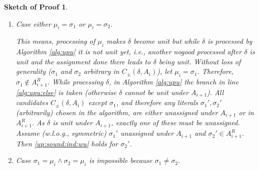 \documentclass{vutinfth} %
\newtheorem{proof-sketch}{Sketch of Proof}[chapter]
\newcommand{\ass}{A}
\newcommand{\cdpm}{C_\pm}
\newcommand{\sgl}{\mu}
\newcommand{\bsgl}{\sigma}
\begin{document}
\begin{proof-sketch}
\begin{enumerate}
\begin{enumerate}[label=\alph*),ref=\theenumi.\alph*]
\begin{enumerate}[label=\roman*.,ref=\theenumii.\roman*]
		$\Delta_i^\pm(\bsgl_1) = \Delta_{i+1}^\pm(\bsgl_1)$ and $\Delta_i^\pm(\bsgl_2) = \Delta_{i+1}^\pm(\bsgl_2)$, as watch sets are only modified in case $\bsgl_1 = \sgl_i$ and respectively $\bsgl_2 = \sgl_i$ (see Algorithm \ref{alg:upu}: only nogoods that are being iterated over in line \ref{alg:upu:it} are being removed from any watch sets in line \ref{alg:upu:rm}). Both $\bsgl_1$ and $\bsgl_2$ are in $A_{i+1}^R$, because $\ass_{i}^R \setminus \{ \sgl_i \} \subseteq \ass_{i+1}^R$, thus we have \ref{up:sound:ind:wu}.
		
		\item Case either $\sgl_i = \bsgl_1$ or $\sgl_i = \bsgl_2$.
		\label{sigmaprimes}		
		
		This means, processing of $\sgl_i$ makes $\delta$ become unit but while $\delta$ is processed by Algorithm \ref{alg:upu} it is not unit yet, i.e., another nogood processed after $\delta$ is unit and the assignment done there leads to $\delta$ being unit.
		Without loss of generality ($\bsgl_1$ and $\bsgl_2$ arbitrary in $\cdpm(\delta, \ass_i)$), let $\sgl_i = \bsgl_1$. Therefore, $\bsgl_1 \not \in A_{i+1}^R$. While processing $\delta$, in Algorithm \ref{alg:upu} the branch in line \ref{alg:upu:else} is taken (otherwise $\delta$ cannot be unit under $\ass_{i+1}$). All candidates $\cdpm(\delta, \ass_i)$ except $\bsgl_1$, and therefore any literals $\bsgl_1', \bsgl_2'$ (arbitrarily) chosen in the algorithm, are either unassigned under $\ass_{i+1}$ or in $\ass_{i+1}^R$. As $\delta$ is unit under $\ass_{i+1}$, exactly one of these must be unassigned.
		Assume (w.l.o.g., symmetric) $\bsgl_1'$ unassigned under $A_{i+1}$ and $\bsgl_2' \in \ass_{i+1}^R$. Then \ref{up:sound:ind:wu} holds for $\bsgl_2'$.
		
		\item Case $\bsgl_1 = \sgl_i \wedge \bsgl_2 = \sgl_i$ is impossible because $\bsgl_1 \not = \bsgl_2$.
		\end{enumerate}
\end{enumerate}


\end{enumerate}
\end{proof-sketch}
\end{document}
